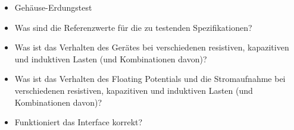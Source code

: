 \begin{itemize}
    \item
        Geh\"ause-Erdungstest
    \item
        Was sind die Referenzwerte f\"ur die zu testenden Spezifikationen?
    \item
        Was  ist das  Verhalten  des Ger\"ates  bei verschiedenen  resistiven,
        kapazitiven und induktiven Lasten (und Kombinationen davon)?
    \item
        Was ist  das Verhalten des  Floating Potentials und  die Stromaufnahme
        bei verschiedenen  resistiven, kapazitiven und induktiven  Lasten (und
        Kombinationen davon)?
    \item
        Funktioniert das Interface korrekt?
\end{itemize}
